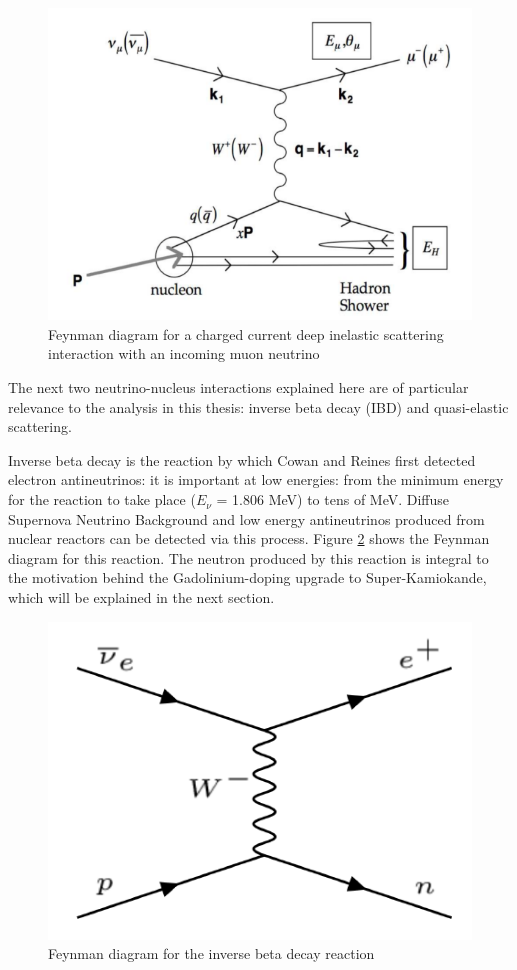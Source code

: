 \begin{figure}
    \includegraphics[width=\textwidth]{Figures/CC_DIS.png}
    \caption{Feynman diagram for a charged current deep inelastic scattering interaction with an incoming muon neutrino}
    \label{fig:CC_DIS}
\end{figure}


The next two neutrino-nucleus interactions explained here are of particular relevance to the analysis in this thesis: inverse beta decay (IBD) and quasi-elastic scattering. 

Inverse beta decay is the reaction by which Cowan and Reines first detected electron antineutrinos: it is important at low energies: from the minimum energy for the reaction to take place ($E_{\nu}$ = 1.806 MeV) to tens of MeV. Diffuse Supernova Neutrino Background and low energy antineutrinos produced from nuclear reactors can be detected via this process. Figure \ref{fig:IBD_feynman} shows the Feynman diagram for this reaction. The neutron produced by this reaction is integral to the motivation behind the Gadolinium-doping upgrade to Super-Kamiokande, which will be explained in the next section.

\begin{figure}
    \includegraphics[width=\textwidth]{Figures/IBD_feynman.png}
    \caption{Feynman diagram for the inverse beta decay reaction}
    \label{fig:IBD_feynman}
\end{figure}


